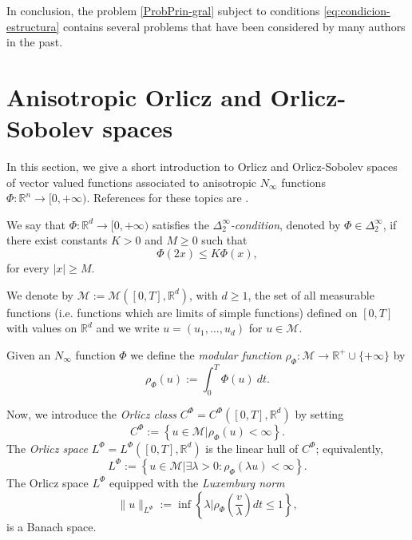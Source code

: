 \documentclass[twoside]{article}
\theoremstyle{remark}
\newcommand{\orlnor}{\|_{L^{\Phi}}}
\newcommand{\lphi}{L^{\Phi}}
\newcommand{\claseor}{C^{\Phi}}
\newcommand{\rr}{\mathbb{R}}
\renewcommand{\leq}{\leqslant}
\renewcommand{\geq}{\geqslant}
\begin{document}
In conclusion, the problem \eqref{ProbPrin-gral} subject to conditions \eqref{eq:condicion-estructura}  contains several problems that have been considered by many authors in the past. 



\section{Anisotropic Orlicz and Orlicz-Sobolev spaces}\label{preliminares}

In this section, we give a short introduction to  Orlicz and Orlicz-Sobolev spaces of vector valued functions associated to anisotropic $N_{\infty}$ functions $\Phi:\rr^n\to[0,+\infty)$.  References for  these topics are \cite{Desch2001,Orliczvectorial2005,Skaff1969}.



We say that  $\Phi:\mathbb{R}^d\rightarrow [0,+\infty)$ satisfies the  \emph{$\Delta_2^{\infty}$-condition}, denoted by $\Phi \in \Delta_2^{\infty}$,
if there exist  constants $K>0$ and  $M\geq 0$ such that
\begin{equation}\label{delta2defi}\Phi(2x)\leq K \Phi(x),
\end{equation}
for every $|x|\geq M$.



 We denote by $\mathcal{M}:=\mathcal{M}\left([0,T],\rr^d\right)$, with $d\geq 1$,  the set of all measurable functions (i.e. functions which are limits of simple functions)  defined on $[0,T]$ with values on $\mathbb{R}^d$ and  we write $u=(u_1,\dots,u_d)$ for  $u\in \mathcal{M}$.

 Given  an $N_{\infty}$ function $\Phi$ we define the \emph{modular function} 
$\rho_{\Phi}:\mathcal{M}\to \mathbb{R}^+\cup\{+\infty\}$ by
\[\rho_{\Phi}(u):= \int_0^T \Phi(u)\ dt.\]

Now, we introduce the \emph{Orlicz class} $C^{\Phi}=C^{\Phi}\left([0,T],\rr^d\right)$   by setting
\begin{equation}\label{claseOrlicz}
  C^{\Phi}:=\left\{u\in \mathcal{M} | \rho_{\Phi}(u)< \infty \right\}.
\end{equation}
The \emph{Orlicz space} $\lphi=L^{\Phi}\left([0,T],\rr^d\right)$ is the linear hull of $\claseor$;
equivalently,
\begin{equation}\label{espacioOrlicz}
\lphi:=\left\{ u\in \mathcal{M}| \exists \lambda>0: \rho_{\Phi}(\lambda u) < \infty   \right\}.
\end{equation}
  The Orlicz space $\lphi$ equipped with the \emph{Luxemburg norm}
\[
\|  u  \orlnor:=\inf \left\{ \lambda\bigg| \rho_{\Phi}\left(\frac{v}{\lambda}\right) dt\leq 1\right\},
\]
is a Banach space. 
\end{document}
